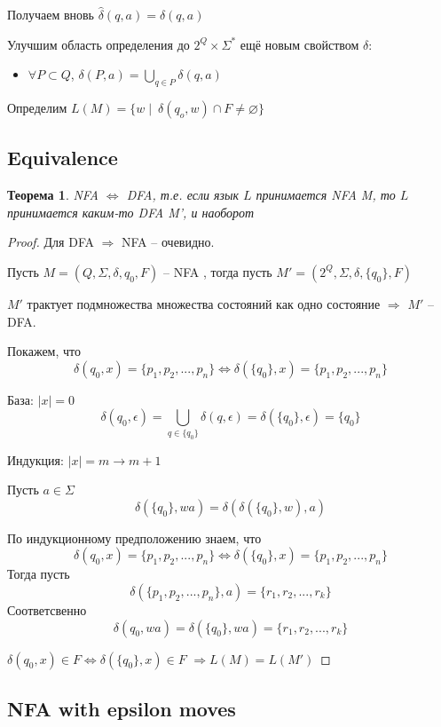 \documentclass[5pt]{article}
\newtheorem{theorem}{Теорема}
\begin{document}
Получаем вновь $\hat{\delta}(q, a) = \delta(q, a)$

Улучшим область определения до $2^Q \times \Sigma^*$ ещё новым свойством $\delta$:

\begin{itemize}
  \item $\forall P \subset Q$,  $ \delta(P, a) = \bigcup\limits_{q \in P}\delta(q, a)$
\end{itemize}

Определим $L(M) = \{ w \mid\ \delta(q_o, w) \cap F \neq \varnothing\}$

\subsection{Equivalence}

\begin{theorem}
NFA $\Leftrightarrow$ DFA, т.е. если язык $L$ принимается NFA M, то $L$ принимается каким-то DFA M', и наоборот

\end{theorem}
\begin{proof}
Для DFA $\Rightarrow$ NFA -- очевидно.

Пусть $M = (Q, \Sigma, \delta ,q_0, F)$ -- NFA
, тогда пусть $M' = (2^Q, \Sigma, \delta , \{q_0\}, F)$

$M'$ трактует подмножества множества состояний как одно состояние $\Rightarrow$ $M'$ -- DFA.

Покажем, что
$$\delta(q_0, x) = \{p_1, p_2, ..., p_n\} \Leftrightarrow \delta(\{q_0\}, x) = \{p_1, p_2, ..., p_n\}$$

База: $|x| = 0$ 
$$\delta(q_0, \epsilon) = \bigcup\limits_{q \in \{q_0\}}\delta(q, \epsilon) = \delta(\{q_0\}, \epsilon) = \{q_0\}$$

Индукция: $|x| = m \rightarrow m + 1$

Пусть $a \in \Sigma$
$$\delta(\{q_0\}, wa) = \delta(\delta(\{q_0\}, w), a)$$

По индукционному предположению знаем, что
$$\delta(q_0, x) = \{p_1, p_2, ..., p_n\} \Leftrightarrow \delta(\{q_0\}, x) = \{p_1, p_2, ..., p_n\}$$
Тогда пусть
$$\delta(\{p_1, p_2, ..., p_n\}, a) = \{r_1, r_2, ..., r_k \}$$
Соответсвенно
$$\delta(q_0, wa) = \delta(\{q_0\}, wa) = \{r_1, r_2, ..., r_k \}$$

$\delta(q_0, x) \in F \Leftrightarrow \delta(\{q_0\}, x) \in F$
$\Rightarrow L(M) = L(M')$
\end{proof}

\subsection{NFA with epsilon moves}
\end{document}
